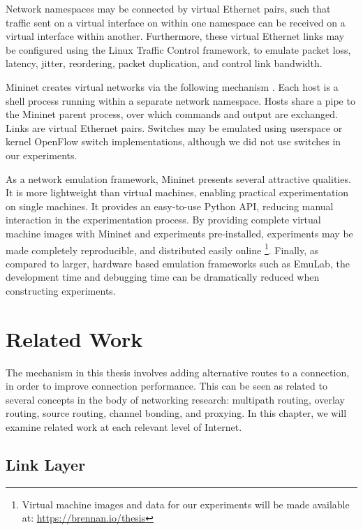 \documentclass{cwru}
\begin{document}
Network namespaces may be connected by virtual Ethernet pairs, such that traffic
sent on a virtual interface on within one namespace can be received on a virtual
interface within another. Furthermore, these virtual Ethernet links may be
configured using the Linux Traffic Control framework, to emulate packet loss,
latency, jitter, reordering, packet duplication, and control link bandwidth.

Mininet creates virtual networks via the following mechanism
\cite{lantz2010network}. Each host is a shell process running within a separate
network namespace. Hosts share a pipe to the Mininet parent process, over which
commands and output are exchanged. Links are virtual Ethernet pairs. Switches
may be emulated using userspace or kernel OpenFlow switch implementations,
although we did not use switches in our experiments.

As a network emulation framework, Mininet presents several attractive qualities.
It is more lightweight than virtual machines, enabling practical experimentation
on single machines. It provides an easy-to-use Python API, reducing manual
interaction in the experimentation process. By providing complete virtual
machine images with Mininet and experiments pre-installed, experiments may be
made completely reproducible, and distributed easily online \footnote{Virtual
  machine images and data for our experiments will be made available at:
  \url{https://brennan.io/thesis}}. Finally, as compared to larger, hardware
based emulation frameworks such as EmuLab\cite{hibler2008large}, the development
time and debugging time can be dramatically reduced when constructing
experiments.

\chapter{Related Work}
\label{c:rw}

The mechanism in this thesis involves adding alternative routes to a connection,
in order to improve connection performance. This can be seen as related to
several concepts in the body of networking research: multipath routing, overlay
routing, source routing, channel bonding, and proxying. In this chapter, we will
examine related work at each relevant level of Internet.

\section{Link Layer}
\label{s:rw-ll}
\end{document}
